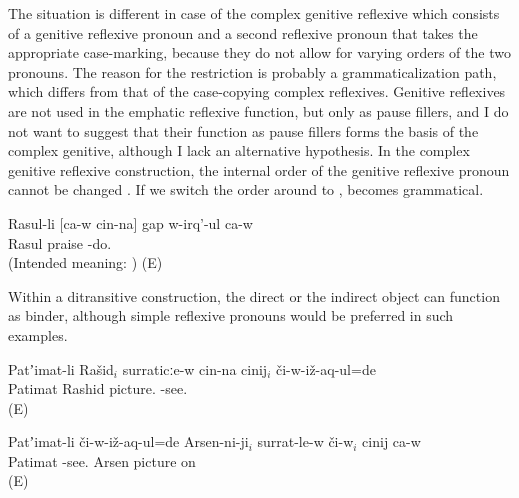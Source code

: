 The situation is different in case of the complex genitive reflexive which consists of a genitive reflexive pronoun and a second reflexive pronoun that takes the appropriate case-marking, because they do not allow for varying orders of the two pronouns. The reason for the restriction is probably a grammaticalization path, which differs from that of the case-copying complex reflexives. Genitive reflexives are not used in the emphatic reflexive function, but only as pause fillers, and I do not want to suggest that their function as pause fillers forms the basis of the complex genitive, although I lack an alternative hypothesis. In the complex genitive reflexive construction, the internal order of the genitive reflexive pronoun cannot be changed . If we switch the order around to ,  becomes grammatical.
%
\begin{exe}
	\ex	\label{ex:Rasul is praising himself ungrammatical@29c}
	\gll	{*} 	Rasul-li [ca-w cin-na] gap w-irq'-ul	ca-w\\
		{}	Rasul			praise -do.	\\
	\glt	(Intended meaning: ) (E)
\end{exe}

Within a ditransitive construction, the direct  or the indirect object  can function as binder, although simple reflexive pronouns would be preferred in such examples.
%
\begin{exe}

		\ex	\label{ex:Patimat showed Rashid to himself on the picture@12a}
		\gll	Patʼimat-li	Rašid$_{i}$	surraticːe-w	cin-na	cinij$_{i}$	či-w-iž-aq-ul=de\\
			Patimat	Rashid	picture.			-see.\\
		\glt	{} (E)

		\ex	\label{ex:Patimat showed to Arsen himself on the picture@12b}
		\gll	Patʼimat-li	či-w-iž-aq-ul=de	Arsen-ni-ji$_{i}$	surrat-le-w	či-w$_{i}$	cinij	ca-w\\
			Patimat	-see.	Arsen	picture	on		  \\
		\glt	{} (E)

\end{exe}

